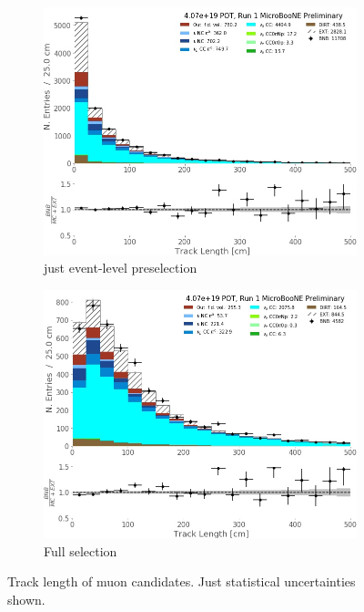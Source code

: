 \begin{figure}[ht]
\begin{center}
\begin{subfigure}[b]{0.45\textwidth}
    \includegraphics[width=1.00\textwidth]{NuMuCCsel/Images/Ryan/Run1_trklen_evtsel.jpg}
    \caption{\label{fig:NuMUCCsel:ryan:trklenEvt} just event-level preselection}
    \end{subfigure} \newline
    \begin{subfigure}[b]{0.45\textwidth}
    \centering
    \includegraphics[width=1.00\textwidth]{NuMuCCsel/Images/Ryan/Run1_trklen_fullsel.jpg}
    \caption{\label{fig:NuMUCCsel:ryan:trklenFull} Full selection}
    \end{subfigure}
\caption{Track length of muon candidates. Just statistical uncertainties shown.}
\end{center}
\end{figure}

